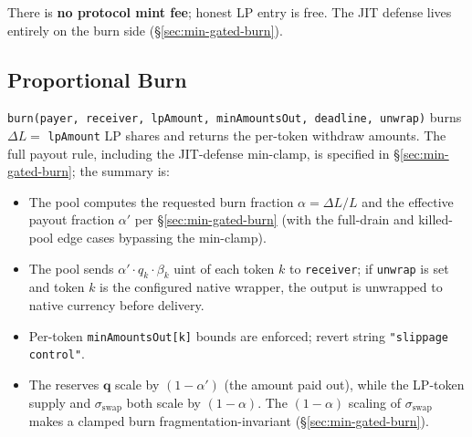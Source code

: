 \documentclass[11pt]{article}
\begin{document}

There is \textbf{no protocol mint fee}; honest LP entry is free. The
JIT defense lives entirely on the burn side
(\S\ref{sec:min-gated-burn}).

\subsection{Proportional Burn}
\label{sec:burn}

\texttt{burn(payer, receiver, lpAmount, minAmountsOut, deadline,
unwrap)} burns $\Delta L =$ \texttt{lpAmount} LP shares and returns the
per-token withdraw amounts. The full payout rule, including the
JIT-defense min-clamp, is specified in \S\ref{sec:min-gated-burn}; the
summary is:
\begin{itemize}
  \item The pool computes the requested burn fraction
        $\alpha = \Delta L / L$ and the effective payout fraction
        $\alpha'$ per \S\ref{sec:min-gated-burn} (with the full-drain
        and killed-pool edge cases bypassing the min-clamp).
  \item The pool sends $\alpha' \cdot q_k \cdot \beta_k$ uint of each
        token $k$ to \texttt{receiver}; if \texttt{unwrap} is set and
        token $k$ is the configured native wrapper, the output is
        unwrapped to native currency before delivery.
  \item Per-token \texttt{minAmountsOut[k]} bounds are enforced;
        revert string \texttt{"slippage control"}.
  \item The reserves $$ scale by $(1 - \alpha')$ (the
        amount paid out), while the LP-token supply and
        $\sigma_{}$ both scale by $(1 - \alpha)$. The
        $(1-\alpha)$ scaling of $\sigma_{}$ makes a clamped
        burn fragmentation-invariant (\S\ref{sec:min-gated-burn}).
\end{itemize}
\end{document}
